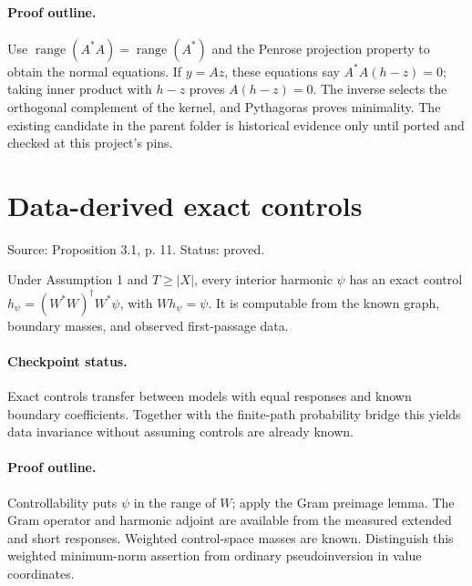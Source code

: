 \paragraph{Proof outline.}

Use $\operatorname{range}(A^*A)=\operatorname{range}(A^*)$ and the Penrose projection property to obtain the normal equations. If $y=Az$, these equations say $A^*A(h-z)=0$; taking inner product with $h-z$ proves $A(h-z)=0$. The inverse selects the orthogonal complement of the kernel, and Pythagoras proves minimality. The existing candidate in the parent folder is historical evidence only until ported and checked at this project's pins.
\nodebreak
\section{Data-derived exact controls}
Source: Proposition 3.1, p. 11. Status: proved.
\begin{proposition}\label{controls}

Under Assumption 1 and $T\geq|X|$, every interior harmonic $\psi$ has an exact control $h_\psi=(W^*W)^\dagger W^*\psi$, with $Wh_\psi=\psi$. It is computable from the known graph, boundary masses, and observed first-passage data.


\paragraph{Checkpoint status.}
Exact controls transfer between models with equal responses and known boundary coefficients. Together with the finite-path probability bridge this yields data invariance without assuming controls are already known.
\end{proposition}
\paragraph{Proof outline.}

Controllability puts $\psi$ in the range of $W$; apply the Gram preimage lemma. The Gram operator and harmonic adjoint are available from the measured extended and short responses. Weighted control-space masses are known. Distinguish this weighted minimum-norm assertion from ordinary pseudoinversion in value coordinates.
\nodebreak
